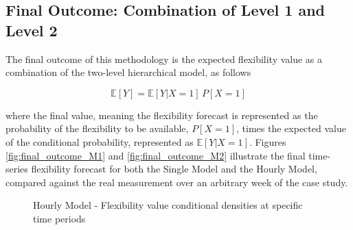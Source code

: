 \subsection{Final Outcome: Combination of Level 1 and Level 2}  \label{Sect:ResultsFinalOutcome} 
The final outcome of this methodology is the expected flexibility value as a combination of the two-level hierarchical model, as follows

\begin{equation}
  \mathbb{E}[Y] = \mathbb{E}[Y|X=1] \,  P[X=1]
\end{equation}

where the final value, meaning the flexibility forecast is represented as the probability of the flexibility to be available, $ P[X=1]$,  times the expected value of the conditional probability, represented as $\mathbb{E}[Y|X=1]$. Figures \ref{fig:final_outcome_M1} and \ref{fig:final_outcome_M2} illustrate the final time-series flexibility forecast for both the Single Model and the Hourly Model, compared against the real measurement over an arbitrary week of the case study.



\begin{figure}
\centering    
{}
\caption{Hourly Model - Flexibility value conditional densities at specific time periods}
\label{fig:conditional_densities_2}
\end{figure}


